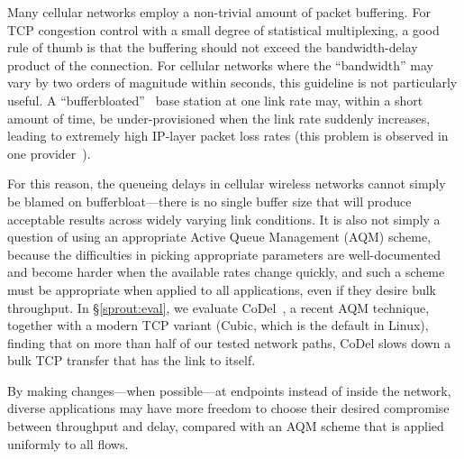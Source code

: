 
Many cellular networks employ a non-trivial amount of packet
buffering. For TCP congestion control with a small degree of
statistical multiplexing, a good rule of thumb is that the buffering
should not exceed the bandwidth-delay product of the connection. For
cellular networks where the ``bandwidth'' may vary by two orders of
magnitude within seconds, this guideline is not particularly useful. A
``bufferbloated''~\cite{bufferbloat} base station at one link rate
may, within a short amount of time, be under-provisioned when the link
rate suddenly increases, leading to extremely high IP-layer packet
loss rates (this problem is observed in one
provider~\cite{Mahajan12}).

For this reason, the queueing delays in cellular wireless networks cannot simply be blamed
on bufferbloat---there is no single buffer size that will
produce acceptable results across widely varying link conditions. It is also not simply a question of using an appropriate
Active Queue Management (AQM) scheme, because the difficulties in
picking appropriate parameters are well-documented and become harder
when the available rates change quickly, and such a scheme must be
appropriate when applied to all applications, even if they desire bulk
throughput. In \S\ref{sprout:eval}, we evaluate CoDel~\cite{CoDel}, a
recent AQM technique, together with a modern TCP variant (Cubic, which
is the default in Linux), finding that on more than half of our tested
network paths, CoDel slows down a bulk TCP transfer that has the link
to itself.
%

By making changes---when possible---at endpoints
instead of inside the network, diverse applications may have more
freedom to choose their desired compromise between throughput and
delay, compared with an AQM scheme that is applied uniformly to all
flows.


